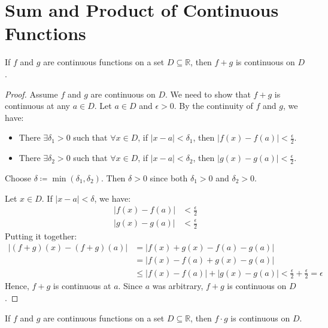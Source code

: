 \section{Sum and Product of Continuous Functions}

\begin{theorem}
    If $f$ and $g$ are continuous functions on a set $D \subseteq \mathbb{R}$, then $f + g$ is continuous on $D$.
\end{theorem}

\begin{proof}
    Assume $f$ and $g$ are continuous on $D$. We need to show that $f + g$ is continuous at any $a \in D$. Let $a \in D$ and $\epsilon > 0$. By the continuity of $f$ and $g$, we have:

    \begin{itemize}
        \item There $\exists \delta_1 > 0$ such that
        $\forall x \in D$, if $|x - a| < \delta_1$,
        then $|f(x) - f(a)| < \frac{\epsilon}{2}$.

        \item There $\exists \delta_2 > 0$ such that
        $\forall x \in D$, if $|x - a| < \delta_2$,
        then $|g(x) - g(a)| < \frac{\epsilon}{2}$.
    \end{itemize}

    Choose $\delta \coloneqq \min(\delta_1, \delta_2)$. Then $\delta > 0$ since both $\delta_1 > 0$ and $\delta_2 > 0$.
    
    Let $x\in D$. If $|x - a| < \delta$, we have:
    \begin{align*}
    |f(x) - f(a)| &< \frac{\epsilon}{2}\\
    |g(x) - g(a)| &< \frac{\epsilon}{2}
    \end{align*}
    Putting it together:
    \begin{align*}
        \left| (f+g)(x) - (f+g)(a) \right|
        &= |f(x) + g(x) - f(a) - g(a)|\\
        &= |f(x) - f(a) + g(x) - g(a)|\\
        &\leq |f(x) - f(a)| + |g(x) - g(a)|
        < \frac{\epsilon}{2} + \frac{\epsilon}{2} = \epsilon
    \end{align*}
    Hence, $f + g$ is continuous at $a$. Since $a$ was arbitrary, $f + g$ is continuous on $D$.
\end{proof}



\pagebreak
\begin{theorem}
    If $f$ and $g$ are continuous functions on a set $D \subseteq \mathbb{R}$, then $f \cdot g$ is continuous on $D$.
\end{theorem}

